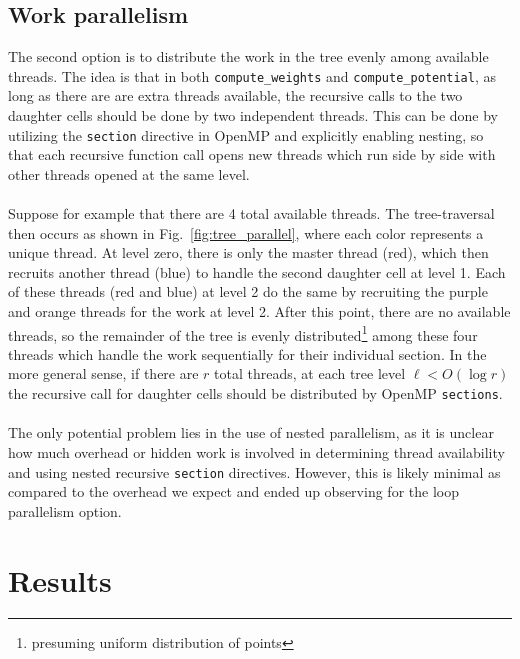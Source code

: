 \documentclass{article}
\begin{document}
\subsection{Work parallelism}
The second option is to distribute the work in the tree evenly among available threads. The idea is that in both {\tt compute\_weights} and {\tt compute\_potential}, as long as there are are extra threads available, the recursive calls to the two daughter cells should be done by two independent threads. This can be done by utilizing the {\tt section} directive in OpenMP and {explicitly} enabling nesting, so that each recursive function call opens new threads which run side by side with other threads opened at the same level.\\\\
Suppose for example that there are 4 total available threads. The tree-traversal then occurs as shown in Fig.~\ref{fig:tree_parallel}, where each color represents a unique thread. At level zero, there is only the master thread (red), which then recruits another thread (blue) to handle the second daughter cell at level 1. Each of these threads (red and blue) at level 2 do the same by recruiting the purple and orange threads for the work at level 2. After this point, there are no available threads, so the remainder of the tree is evenly distributed\footnote{presuming uniform distribution of points} among these four threads which handle the work sequentially for their individual section. In the more general sense, if there are $r$ total threads, at each tree level $\ell<O(\log r)$ the recursive call for daughter cells should be distributed by OpenMP {\tt sections}.\\\\
The only potential problem lies in the use of nested parallelism, as it is unclear how much overhead or hidden work is involved in determining thread availability and using nested recursive {\tt section} directives. However, this is likely minimal as compared to the overhead we expect and ended up observing for the loop parallelism option.
\section{Results}
\end{document}
